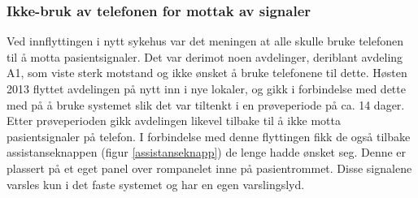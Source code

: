 \subsubsection{Ikke-bruk av telefonen for mottak av signaler}
Ved innflyttingen i nytt sykehus var det meningen at alle skulle bruke telefonen til å motta pasientsignaler. Det var derimot noen avdelinger, deriblant avdeling A1, som viste sterk motstand og ikke ønsket å bruke telefonene til dette.
Høsten 2013 flyttet avdelingen på nytt inn i nye lokaler, og gikk i forbindelse med dette med på å bruke systemet slik det var tiltenkt i en prøveperiode på ca. 14 dager. Etter  prøveperioden gikk avdelingen likevel tilbake til å ikke motta pasientsignaler på telefon. I forbindelse med denne flyttingen fikk de også tilbake assistanseknappen (figur \ref{assistanseknapp}) de lenge hadde ønsket seg. Denne er plassert på et eget panel over rompanelet inne på pasientrommet. Disse signalene varsles kun i det faste systemet og har en egen varslingslyd.

